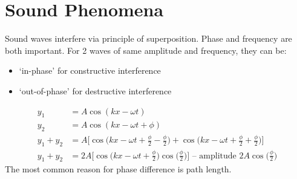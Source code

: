\documentclass[a4paper, 11pt, normalem]{report}
\begin{document}
\section{Sound Phenomena}
Sound waves interfere via principle of superposition.
Phase and frequency are both important.
For 2 waves of same amplitude and frequency, they can be:
\begin{itemize}
    \item `in-phase' for constructive interference
    \item `out-of-phase' for destructive interference
\end{itemize}
\begin{align}
    y_{1} &= A\cos{(kx - \omega t)} \\
    y_{2} &= A\cos{(kx - \omega t + \phi)}\\
    y_{1} + y_{2} &= A\Big[\cos{\Big(kx - \omega t + \frac{\phi}{2} - \frac{\phi}{2}\Big)} + \cos{\Big(kx - \omega t + \frac{\phi}{2} + \frac{\phi}{2}\Big)}\Big] \\
    y_{1} + y_{2} &= 2A\Big[\cos{\Big(kx - \omega t + \frac{\phi}{2}\Big)}\cos{\Big(\frac{\phi}{2}\Big)}\Big]\text{ -- amplitude }2A\cos{\Big(\frac{\phi}{2}\Big)}
\end{align}
The most common reason for phase difference is path length.
\end{document}
